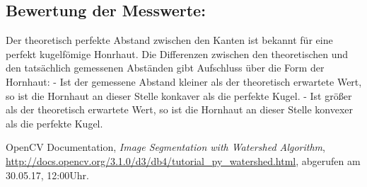 \documentclass{../Vorlage/sebDenCls}
\begin{document}
\subsection{Bewertung der Messwerte:}
Der theoretisch perfekte Abstand zwischen den Kanten ist bekannt für eine perfekt kugelfömige Honrhaut. Die Differenzen zwischen den theoretischen und den tatsächlich gemessenen Abständen gibt Aufschluss über die Form der Hornhaut: 
- Ist der gemessene Abstand kleiner als der theoretisch erwartete Wert, so ist die Hornhaut an dieser Stelle konkaver als die perfekte Kugel.
- Ist größer als der theoretisch erwartete Wert, so ist die Hornhaut an dieser Stelle konvexer als die perfekte Kugel.

\begin{thebibliography}{9}
	
		OpenCV Documentation,
		\emph{Image Segmentation with Watershed Algorithm},
		\url{http://docs.opencv.org/3.1.0/d3/db4/tutorial_py_watershed.html},
		abgerufen am 30.05.17, 12:00Uhr.
	
\end{thebibliography}
\end{document}
